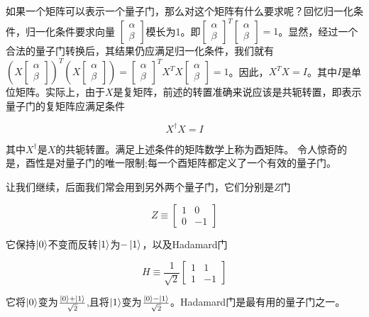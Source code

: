 如果一个矩阵可以表示一个量子门，那么对这个矩阵有什么要求呢？回忆归一化条件，归一化条件要求向量
$\begin{bmatrix}\alpha \\ \beta\end{bmatrix}$模长为1。即$\begin{bmatrix}\alpha \\ \beta\end{bmatrix}^T\begin{bmatrix}\alpha \\ \beta\end{bmatrix} = 1$。显然，经过一个合法的量子门转换后，其结果仍应满足归一化条件，我们就有$(X\begin{bmatrix}\alpha \\ \beta\end{bmatrix})^T(X\begin{bmatrix}\alpha \\ \beta\end{bmatrix}) = \begin{bmatrix}\alpha \\ \beta\end{bmatrix}^TX^TX\begin{bmatrix}\alpha \\ \beta\end{bmatrix} = 1$。因此，$X^TX = I$。其中$I$是单位矩阵。实际上，由于$X$是复矩阵，前述的转置准确来说应该是共轭转置，即表示量子门的复矩阵应满足条件

\begin{equation}
X^{\dag}X = I
\end{equation}

其中$X^{\dag}$是$X$的共轭转置。满足上述条件的矩阵数学上称为酉矩阵。
令人惊奇的是，酉性是对量子门的唯一限制;每一个酉矩阵都定义了一个有效的量子门。

让我们继续，后面我们常会用到另外两个量子门，它们分别是$Z$门

\begin{equation}
Z \equiv
\begin{bmatrix}
1 & 0 \\
0 & -1
\end{bmatrix}
\end{equation}

它保持$\ket{0}$不变而反转$\ket{1}$为$-\ket{1}$，以及Hadamard门

\begin{equation}
H \equiv \frac{1}{\sqrt{2}}
\begin{bmatrix}
1 & 1 \\
1 & -1
\end{bmatrix}
\end{equation}

它将$\ket{0}$变为$\frac{\ket{0} + \ket{1}}{\sqrt{2}}$,且将$\ket{1}$变为$\frac{\ket{0} - \ket{1}}{\sqrt{2}}$。Hadamard门是最有用的量子门之一。

